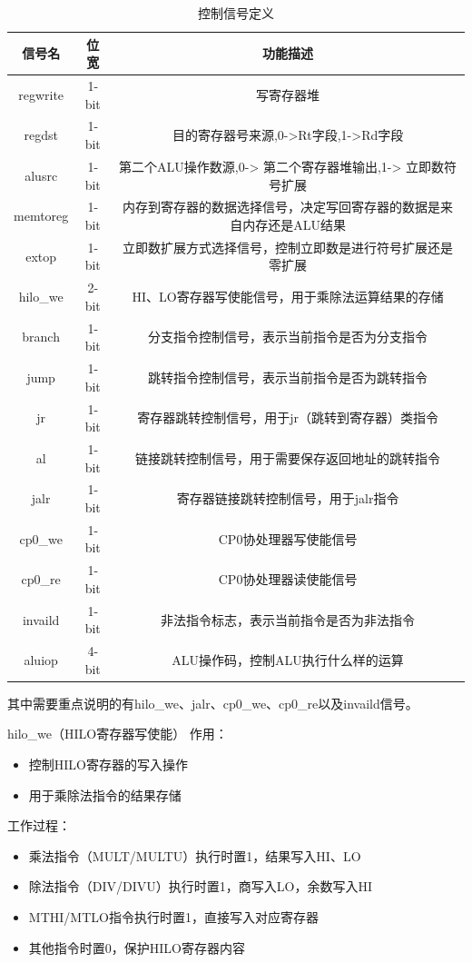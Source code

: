 \begin{table}
\centering
\begin{tabular}{|c|c|c|} \hline 
	信号名&  位宽& 功能描述\\ \hline 
	regwrite&  1-bit& 写寄存器堆\\ \hline 
	regdst&  1-bit& 目的寄存器号来源,0->Rt字段,1->Rd字段\\ \hline 
	alusrc&  1-bit& 第二个ALU操作数源,0-> 第二个寄存器堆输出,1->
	立即数符号扩展\\ \hline 
	memtoreg&  1-bit& 内存到寄存器的数据选择信号，决定写回寄存器的数据是来自内存还是ALU结果\\ \hline 
	extop&  1-bit& 立即数扩展方式选择信号，控制立即数是进行符号扩展还是零扩展\\ \hline 
	hilo_we&  2-bit& HI、LO寄存器写使能信号，用于乘除法运算结果的存储\\ \hline 
	branch&  1-bit& 分支指令控制信号，表示当前指令是否为分支指令\\ \hline 
	jump&  1-bit& 跳转指令控制信号，表示当前指令是否为跳转指令\\ \hline 
	jr&  1-bit& 寄存器跳转控制信号，用于jr（跳转到寄存器）类指令\\ \hline 
	al& 1-bit&链接跳转控制信号，用于需要保存返回地址的跳转指令\\ \hline 
	jalr& 1-bit&寄存器链接跳转控制信号，用于jalr指令\\ \hline 
	cp0_we& 1-bit&CP0协处理器写使能信号\\ \hline 
	cp0_re& 1-bit&CP0协处理器读使能信号\\ \hline 
	invaild& 1-bit&非法指令标志，表示当前指令是否为非法指令\\ \hline 
	aluiop& 4-bit&ALU操作码，控制ALU执行什么样的运算\\ \hline
\end{tabular}
\caption{控制信号定义}
\label{tab:my_label}
\end{table}

其中需要重点说明的有hilo\_we、jalr、cp0\_we、cp0\_re以及invaild信号。


hilo\_we（HILO寄存器写使能） 作用：

\begin{itemize}
\item 控制HILO寄存器的写入操作
\item 用于乘除法指令的结果存储
\end{itemize}
工作过程：

\begin{itemize}
\item 乘法指令（MULT/MULTU）执行时置1，结果写入HI、LO
\item 除法指令（DIV/DIVU）执行时置1，商写入LO，余数写入HI
\item MTHI/MTLO指令执行时置1，直接写入对应寄存器
\item 其他指令时置0，保护HILO寄存器内容
\end{itemize}

